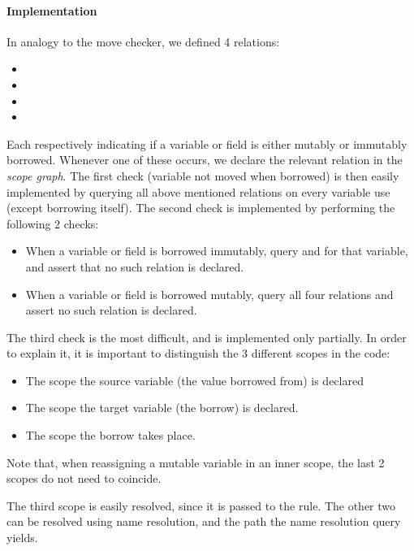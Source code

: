 \paragraph{Implementation}

In analogy to the move checker, we defined 4 relations:
\begin{itemize}
	\item {}
	\item {}
	\item {}
	\item {}
\end{itemize}

Each respectively indicating if a variable or field is either mutably or immutably borrowed. Whenever one of these occurs, we declare the relevant relation in the \textit{scope graph}. The first check (variable not moved when borrowed) is then easily implemented by querying all above mentioned relations on every variable use (except borrowing itself). The second check is implemented by performing the following 2 checks:
\begin{itemize}
    \item When a variable or field is borrowed immutably, query  and  for that variable, and assert that no such relation is declared.
    \item When a variable or field is borrowed mutably, query all four relations and assert no such relation is declared.
\end{itemize}

The third check is the most difficult, and is implemented only partially. In order to explain it, it is important to distinguish the 3 different scopes in the code:
\begin{itemize}
    \item The scope the source variable (the value borrowed from) is declared
    \item The scope the target variable (the borrow) is declared.
    \item The scope the borrow takes place.
\end{itemize}
Note that, when reassigning a mutable variable in an inner scope, the last 2 scopes do not need to coincide.

The third scope is easily resolved, since it is passed to the  rule. The other two can be resolved using name resolution, and the path the name resolution query yields.

